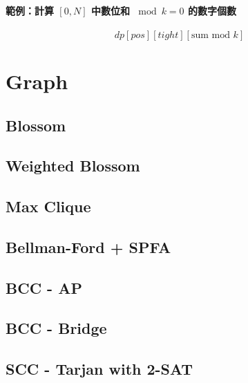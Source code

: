 \documentclass[a4paper,10pt,twocolumn,oneside]{article}
\begin{document}
\paragraph{範例：計算 $[0,N]$ 中數位和 $\bmod k = 0$ 的數字個數}

\[
    dp[pos][tight][\text{sum mod } k]
\]




\section{Graph}

\subsection{Blossom}


\subsection{Weighted Blossom}


\subsection{Max Clique}


% 

\subsection{Bellman-Ford + SPFA}


\subsection{BCC - AP}


\subsection{BCC - Bridge}


\subsection{SCC - Tarjan with 2-SAT}

\end{document}
